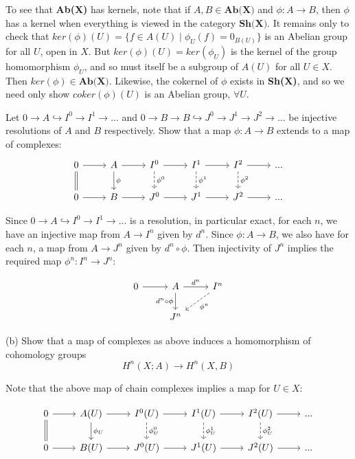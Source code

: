 To see that \textbf{Ab(X)} has kernels, note that if $A,B \in \textbf{Ab(X)}$ and $\phi: A \rightarrow B$, then $\phi$ has a kernel when everything is viewed in the category $\textbf{Sh(X)}$. It remains only to check that $ker(\phi)(U) = \{f \in A(U) \mid \phi_U(f) = 0_{B(U)}\}$ is an Abelian group for all $U$, open in $X$. But $ker(\phi)(U) = ker(\phi_U)$ is the kernel of the group homomorphism $\phi_U$, and so must itself be a subgroup of $A(U)$ for all $U \in X$. Then $ker(\phi) \in \textbf{Ab(X)}$. Likewise, the cokernel of $\phi$ exists in \textbf{Sh(X)}, and so we need only show $coker(\phi)(U)$ is an Abelian group, $\forall U$.

 Let $0 \rightarrow A \hookrightarrow I^0 \rightarrow I^1 \rightarrow ...$ and $0 \rightarrow B \rightarrow B \hookrightarrow J^0 \rightarrow J^1 \rightarrow J^2 \rightarrow ...$ be injective resolutions of $A$ and $B$ respectively. Show that a map $\phi: A \rightarrow B$ extends to a map of complexes:
\[
\begin{tikzcd}
0 \arrow[r] \arrow[d, equal]
& A \arrow[r] \arrow[d, "\phi"]
& I^0 \arrow[r] \arrow[d, "\phi^0", dashed]
& I^1 \arrow[r] \arrow[d, "\phi^1", dashed]
& I^2 \arrow[r] \arrow[d, "\phi^2", dashed]
& ...
\\
0 \arrow[r]
& B \arrow[r]
& J^0 \arrow[r]
& J^1 \arrow[r]
& J^2 \arrow[r]
& ...
\end{tikzcd}
\]

Since $0 \rightarrow A \hookrightarrow I^0 \rightarrow I^1 \rightarrow ...$ is a resolution, in particular exact, for each $n$, we have an injective map from $A \rightarrow I^n$ given by $d^n$. Since $\phi: A \rightarrow B$, we also have for each $n$, a map from $A \rightarrow J^n$ given by $d^n \circ \phi$. Then injectivity of $J^n$ implies the required map $\phi^n:I^n \rightarrow J^n$: 

\[
\begin{tikzcd}
0 \arrow[r] 
& A \arrow[r, "d^n"] \arrow[d, "d^n \circ \phi"']
& I^n \arrow[ld, "\phi^n", dashed]
\\
& 
J^n 
\end{tikzcd}
\]

 (b) Show that a map of complexes as above induces a homomorphism of cohomology groups 
\[ H^n(X;A) \rightarrow H^n(X,B)\] 

Note that the above map of chain complexes implies a map for $U \in X$:

\[
\begin{tikzcd}
0 \arrow[r] \arrow[d, equal]
& A(U) \arrow[r] \arrow[d, "\phi_U"]
& I^0(U) \arrow[r] \arrow[d, "\phi^0_U", dashed]
& I^1(U) \arrow[r] \arrow[d, "\phi^1_U", dashed]
& I^2(U) \arrow[r] \arrow[d, "\phi^2_U", dashed]
& ...
\\
0 \arrow[r]
& B(U) \arrow[r]
& J^0(U) \arrow[r]
& J^1(U) \arrow[r]
& J^2(U) \arrow[r]
& ...
\end{tikzcd}
\]

